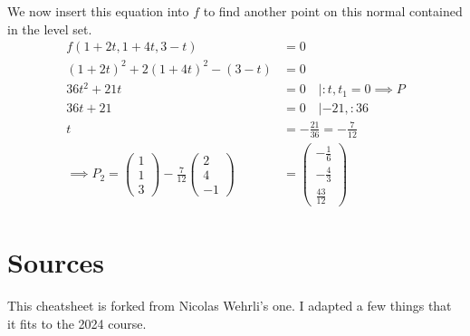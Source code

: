\documentclass[a4paper,fontsize = 10pt]{article}
\begin{document}
We now insert this equation into $f$ to find another point on this normal contained in the level set.
\begin{align*}
  f(1 +2t, 1+ 4t, 3 - t) &= 0 \\
  (1 +2t)^2 + 2(1+4t)^2 - (3-t) &= 0\\
  36 t^2 + 21t &= 0 \quad |:t, t_1 = 0 \implies P\\
  36t + 21 &= 0 \quad |-21, : 36\\
  t &= -\frac{21}{36} = -\frac{7}{12}\\
  \implies P_2 = \begin{pmatrix}
    1\\ 1 \\ 3
  \end{pmatrix} - \frac{7}{12}
  \begin{pmatrix}
    2\\ 4\\ -1
  \end{pmatrix} 
  &= \begin{pmatrix}
    -\frac{1}{6}\\ -\frac{4}{3}\\ \frac{43}{12}
  \end{pmatrix}
\end{align*}


\section{Sources}
This cheatsheet is forked from Nicolas Wehrli's one. I adapted a few things that it fits to the 2024 course. 
\end{document}
